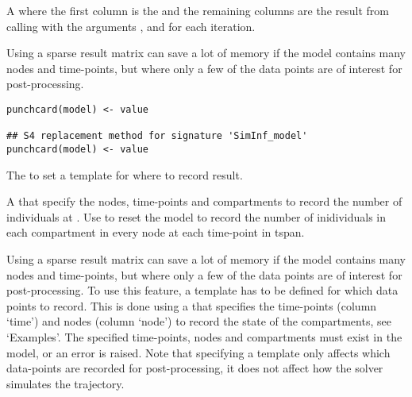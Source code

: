 \documentclass[letterpaper]{book}
\begin{document}
%
\begin{Value}
A  where the first column is the
 and the remaining columns are the result from
calling  with the
arguments ,  and  for
each iteration.
\end{Value}
%
\begin{Description}
Using a sparse result matrix can save a lot of memory if the model
contains many nodes and time-points, but where only a few of the
data points are of interest for post-processing.
\end{Description}
%
\begin{Usage}
\begin{verbatim}
punchcard(model) <- value

## S4 replacement method for signature 'SimInf_model'
punchcard(model) <- value
\end{verbatim}
\end{Usage}
%
\begin{Arguments}
\begin{ldescription}
\item[\code{model}] The  to set a template for where to
record result.

\item[\code{value}] A  that specify the nodes,
time-points and compartments to record the number of
individuals at . Use  to reset the
model to record the number of inidividuals in each compartment
in every node at each time-point in tspan.
\end{ldescription}
\end{Arguments}
%
\begin{Details}
Using a sparse result matrix can save a lot of memory if the model
contains many nodes and time-points, but where only a few of the
data points are of interest for post-processing. To use this
feature, a template has to be defined for which data points to
record. This is done using a  that specifies the
time-points (column `time') and nodes (column
`node') to record the state of the compartments, see
`Examples'. The specified time-points, nodes and
compartments must exist in the model, or an error is raised. Note
that specifying a template only affects which data-points are
recorded for post-processing, it does not affect how the solver
simulates the trajectory.
\end{Details}
\end{document}
